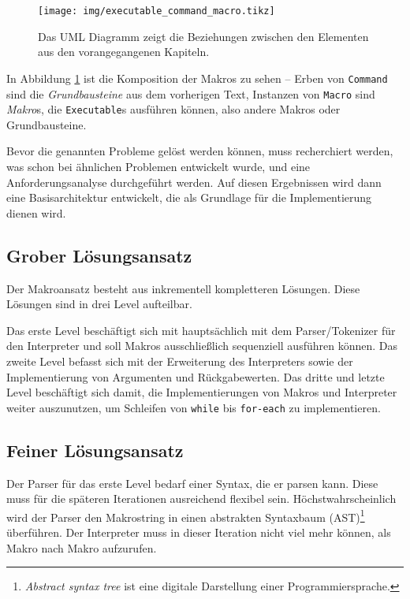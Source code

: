  \begin{figure}[H]
    \centering
    \texttt{[image: img/executable\_command\_macro.tikz]}
    \caption{Das UML Diagramm zeigt die Beziehungen zwischen den Elementen aus den vorangegangenen Kapiteln.}
    \label{fig:executable_command_macro}
  \end{figure}

  In Abbildung \ref{fig:executable_command_macro} ist die Komposition\autocite[S.183]{Gamma:1995:DPE:186897} der Makros zu sehen -- Erben von \texttt{Command} sind die \textit{Grundbausteine} aus dem vorherigen Text, Instanzen von \texttt{Macro} sind \textit{Makro}s, die \texttt{Executable}s ausführen können, also andere Makros oder Grundbausteine.

  Bevor die genannten Probleme gelöst werden können, muss recherchiert werden, was schon bei ähnlichen Problemen entwickelt wurde, und eine Anforderungsanalyse durchgeführt werden. Auf diesen Ergebnissen wird dann eine Basisarchitektur entwickelt, die als Grundlage für die Implementierung dienen wird.

  \subsection{Grober Lösungsansatz}
  \label{ssec:grober_loesungsansatz}
    Der Makroansatz besteht aus inkrementell kompletteren Lösungen. Diese Lösungen sind in drei Level aufteilbar.

    Das erste Level beschäftigt sich mit hauptsächlich mit dem Parser/Tokenizer für den Interpreter und soll Makros ausschließlich sequenziell ausführen können. Das zweite Level befasst sich mit der Erweiterung des Interpreters sowie der Implementierung von Argumenten und Rückgabewerten. Das dritte und letzte Level beschäftigt sich damit, die Implementierungen von Makros und Interpreter weiter auszunutzen, um Schleifen von \texttt{while} bis \texttt{for-each} zu implementieren.

  \subsection{Feiner Lösungsansatz}
  \label{ssec:feiner_loesungsansatz}
    Der Parser für das erste Level bedarf einer Syntax, die er parsen kann. Diese muss für die späteren Iterationen ausreichend flexibel sein. Höchstwahrscheinlich wird der Parser den Makrostring in einen abstrakten Syntaxbaum (AST)\footnote{%
      \textit{Abstract syntax tree} ist eine digitale Darstellung einer Programmiersprache.
    } überführen. Der Interpreter muss in dieser Iteration nicht viel mehr können, als Makro nach Makro aufzurufen.


